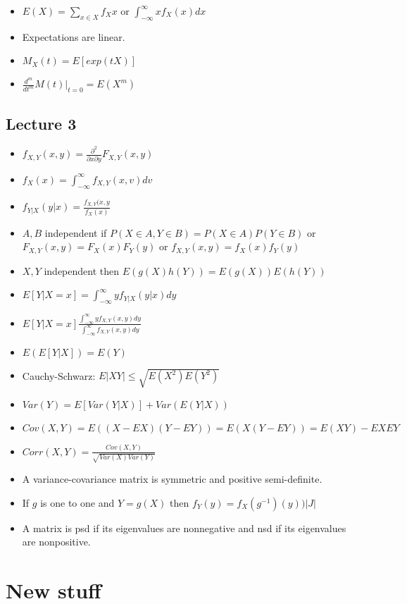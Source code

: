 \documentclass[11pt]{article} %
\begin{document}
\begin{itemize}
\item $E(X) = \sum_{x \in X}f_{X}x \text{ or } \int_{-\infty}^{\infty} xf_X(x)dx$
\item Expectations are linear.
\item $M_{X}(t) = E[exp(tX)]$
\item $\frac{d^{m}}{dt^m}M(t)|_{t=0} = E(X^m)$
\end{itemize}

\subsection{Lecture 3}
\begin{itemize}
\item $f_{X,Y}(x,y) = \frac{\partial^2}{\partial x \partial y}F_{X,Y}(x,y)$
\item $f_{X}(x) = \int_{-\infty}^{\infty} f_{X,Y}(x,v)dv$
\item $f_{Y|X}(y|x) = \frac{f_{X,Y}(x,y}{f_{X}(x)}$
\item $A,B$ independent if $P(X\in A,Y \in B) = P(X\in A)P(Y \in B)$ or $F_{X,Y}(x,y) = F_{X}(x) F_Y(y)$ or $f_{X,Y}(x,y) = f_X(x) f_Y(y)$
\item $X,Y$ independent then $E(g(X)h(Y))=E(g(X))E(h(Y))$
\item $E[Y|X=x] =\int_{-\infty}^{\infty} yf_{Y|X}(y|x)dy$
\item $E[Y|X=x] \frac{\int_{-\infty}^{\infty}yf_{X,Y}(x,y)dy}{\int_{-\infty}^{\infty}f_{X,Y}(x,y)dy}$
\item $E(E[Y|X]) = E(Y)$
\item Cauchy-Schwarz: $E|XY| \leq \sqrt{E(X^2)E(Y^2)}$
\item $Var(Y) = E[Var(Y|X)] + Var(E(Y|X))$
\item $Cov(X,Y) = E((X-EX)(Y-EY)) = E(X(Y-EY)) = E(XY) - EXEY$
\item $Corr(X,Y) = \frac{Cov(X,Y)}{\sqrt{Var(X)Var(Y)}}$
\item A variance-covariance matrix is symmetric and positive semi-definite.
\item If $g$ is one to one and $Y=g(X) $ then $f_Y(y) = f_X(g^{-1})(y))|J|$
\item A matrix is psd if its eigenvalues are nonnegative and nsd if its eigenvalues are nonpositive.
\end{itemize}

\section{New stuff}
\end{document}
